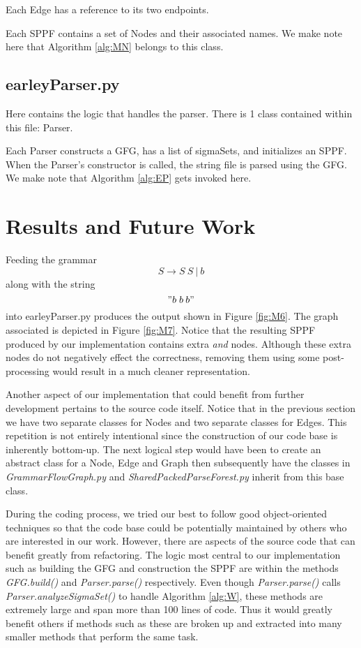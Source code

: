 \documentclass{sigplanconf}
\begin{document}
Each Edge has a reference to its two endpoints. 

Each SPPF contains a set of Nodes and their associated names. We make note here that Algorithm \ref{alg:MN} belongs to this class.

\subsection{earleyParser.py}

Here contains the logic that handles the parser. There is 1 class contained within this file: Parser.

Each Parser constructs a GFG, has a list of sigmaSets, and initializes an SPPF. When the Parser's constructor is called, the string file is parsed using the GFG. We make note that Algorithm \ref{alg:EP} gets invoked here.

\section{Results and Future Work}

Feeding the grammar $$S\longrightarrow{S\:{S\:{|\:{b}}}}$$ along with the string $$"b\;{b\:{b}}"$$ into earleyParser.py produces the output shown in Figure \ref{fig:M6}. The graph associated is depicted in Figure \ref{fig:M7}. Notice that the resulting SPPF produced by our implementation contains extra \textit{and} nodes. Although these extra nodes do not negatively effect the correctness, removing them using some post-processing would result in a much cleaner representation.

Another aspect of our implementation that could benefit from further development pertains to the source code itself. Notice that in the previous section we have two separate classes for Nodes and two separate classes for Edges. This repetition is not entirely intentional since the construction of our code base is inherently bottom-up. The next logical step would have been to create an abstract class for a Node, Edge and Graph then subsequently have the classes in \textit{GrammarFlowGraph.py} and \textit{SharedPackedParseForest.py} inherit from this base class.

During the coding process, we tried our best to follow good object-oriented techniques so that the code base could be potentially maintained by others who are interested in our work. However, there are aspects of the source code that can benefit greatly from refactoring. The logic most central to our implementation such as building the GFG and construction the SPPF are within the methods \textit{GFG.build()} and \textit{Parser.parse()} respectively. Even though \textit{Parser.parse()} calls \textit{Parser.analyzeSigmaSet()} to handle Algorithm \ref{alg:W}, these methods are extremely large and span more than 100 lines of code. Thus it would greatly benefit others if methods such as these are broken up and extracted into many smaller methods that perform the same task.
\end{document}
